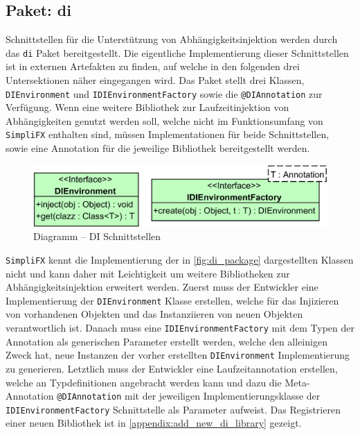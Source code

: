 \subsection{Paket: di}
\label{package_di}
Schnittstellen für die Unterstützung von Abhängigkeitsinjektion werden durch das \texttt{di} Paket bereitgestellt. Die eigentliche Implementierung dieser Schnittstellen ist in externen  Artefakten zu finden, auf welche in den folgenden drei Untersektionen näher eingegangen wird.
Das Paket stellt drei Klassen, \texttt{DIEnvironment} und \texttt{IDIEnvironmentFactory} sowie die \texttt{@DIAnnotation} zur Verfügung. Wenn eine weitere Bibliothek zur Laufzeitinjektion von Abhängigkeiten genutzt werden soll, welche nicht im Funktionsumfang von \texttt{SimpliFX} enthalten sind, müssen Implementationen für beide Schnittstellen, sowie eine Annotation für die jeweilige Bibliothek bereitgestellt werden.
\begin{figure}[H]
	\centering
	\includegraphics[width=\textwidth-2cm]{Abbildungen/DI Paket.png}
	\caption{Diagramm -- DI Schnittstellen}
	\label{fig:di_package}
\end{figure}
\noindent \texttt{SimpliFX} kennt die Implementierung der in \autoref{fig:di_package} dargestellten Klassen nicht und kann daher mit Leichtigkeit um weitere Bibliotheken zur Abhängigkeitsinjektion erweitert werden. Zuerst muss der Entwickler eine Implementierung der \texttt{DIEnvironment} Klasse erstellen, welche für das Injizieren von vorhandenen Objekten und das Instanziieren von neuen Objekten verantwortlich ist. Danach muss eine \texttt{IDIEnvironmentFactory} mit dem Typen der Annotation als generischen Parameter erstellt werden, welche den alleinigen Zweck hat, neue Instanzen der vorher erstellten \texttt{DIEnvironment} Implementierung zu generieren. Letztlich muss der Entwickler eine Laufzeitannotation erstellen, welche an Typdefinitionen angebracht werden kann und dazu die Meta-Annotation \texttt{@DIAnnotation} mit der jeweiligen Implementierungsklasse der \texttt{IDIEnvironmentFactory} Schnittstelle als Parameter aufweist. Das Registrieren einer neuen Bibliothek ist in \autoref{appendix:add_new_di_library} gezeigt.
